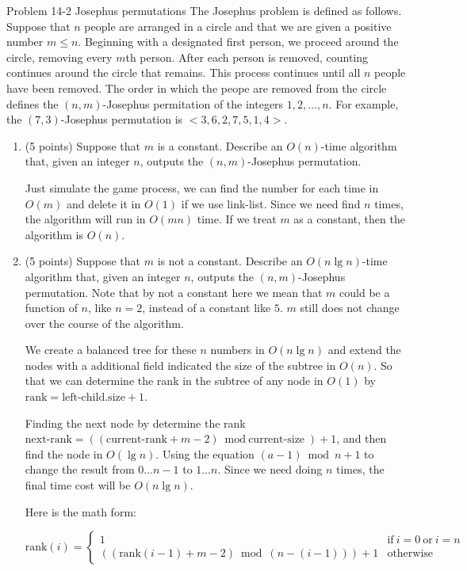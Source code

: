 \documentclass[paper=a4, fontsize=11pt]{scrartcl} %
\begin{document}
\begin{fancyquotes}
  Problem 14-2 Josephus permutations The Josephus problem is defined
  as follows. Suppose that $n$ people are arranged in a circle and
  that we are given a positive number $m\leq n$. Beginning with a
  designated first person, we proceed around the circle, removing
  every $m$th person. After each person is removed, counting continues
  around the circle that remains. This process continues until all $n$
  people have been removed. The order in which the peope are removed
  from the circle defines the $(n,m)$-Josephus permitation of the
  integers $1,2,\ldots,n$. For example, the $(7,3)$-Josephus
  permutation is $<3,6,2,7,5,1,4>$.
\end{fancyquotes}

\begin{enumerate}
\item
  \begin{fancyquotes}
    (5 points) Suppose that $m$ is a constant. Describe an $O(n)$-time
    algorithm that, given an integer $n$, outputs the $(n,m)$-Josephus
    permutation.
  \end{fancyquotes}

  Just simulate the game process, we can find the number for each time
  in $O(m)$ and delete it in $O(1)$ if we use link-list. Since we need
  find $n$ times, the algorithm will run in $O(mn)$ time. If we treat
  $m$ as a constant, then the algorithm is $O(n)$.

\item
  \begin{fancyquotes}
    (5 points) Suppose that $m$ is not a constant. Describe an
    $O(n\lg{n})$-time algorithm that, given an integer $n$, outputs
    the $(n,m)$-Josephus permutation. Note that by not a constant
    here we mean that $m$ could be a function of $n$, like $n=2$,
    instead of a constant like $5$. $m$ still does not change over the
    course of the algorithm.
  \end{fancyquotes}

  We create a balanced tree for these $n$ numbers in $O(n\lg{n})$ and
  extend the nodes with a additional field indicated the size of the
  subtree in $O(n)$. So that we can determine the rank in the subtree
  of any node in $O(1)$ by $\text{rank} = \text{left-child}.\text{size}+1$.

  Finding the next node by determine the rank $\text{next-rank} =
  ((\text{current-rank} + m -2) \bmod \text{current-size}) + 1$, and
  then find the node in $O(\lg{n})$. Using the equation $(a-1)\bmod n
  +1$ to change the result from $0\dots n-1$ to $1\dots n$. Since we
  need doing $n$ times, the final time cost will be $O(n\lg{n})$.

  Here is the math form:

  \begin{equation*}
    \text{rank}(i)=
    \begin{cases}
      1 & \text{if}\ i=0\ \text{or}\ i=n \\
      ((\text{rank}(i-1)+m-2) \bmod (n-(i-1))) +1 & \text{otherwise}
    \end{cases}
  \end{equation*}

\end{enumerate}


\end{document}
